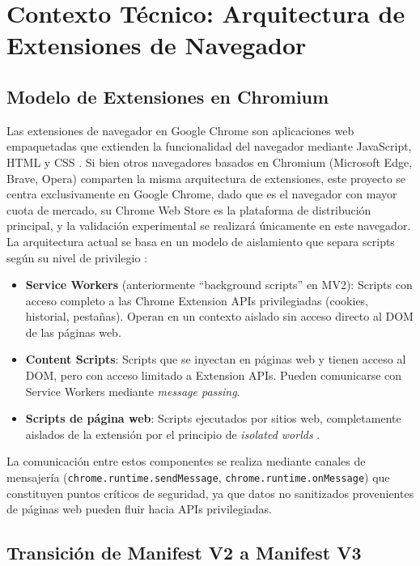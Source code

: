 \documentclass[12pt,oneside]{report}
\begin{document}
\section{Contexto Técnico: Arquitectura de Extensiones de Navegador}

\subsection{Modelo de Extensiones en Chromium}

Las extensiones de navegador en Google Chrome son aplicaciones web empaquetadas que extienden la funcionalidad del navegador mediante JavaScript, HTML y CSS \cite{chrome_extensions_overview}. Si bien otros navegadores basados en Chromium (Microsoft Edge, Brave, Opera) comparten la misma arquitectura de extensiones, este proyecto se centra exclusivamente en Google Chrome, dado que es el navegador con mayor cuota de mercado, su Chrome Web Store es la plataforma de distribución principal, y la validación experimental se realizará únicamente en este navegador. La arquitectura actual se basa en un modelo de aislamiento que separa scripts según su nivel de privilegio \cite{chrome_extensions_security}:

\begin{itemize}
    \item \textbf{Service Workers} (anteriormente ``background scripts'' en MV2): Scripts con acceso completo a las Chrome Extension APIs privilegiadas (cookies, historial, pestañas). Operan en un contexto aislado sin acceso directo al DOM de las páginas web.
    \item \textbf{Content Scripts}: Scripts que se inyectan en páginas web y tienen acceso al DOM, pero con acceso limitado a Extension APIs. Pueden comunicarse con Service Workers mediante \textit{message passing}.
    \item \textbf{Scripts de página web}: Scripts ejecutados por sitios web, completamente aislados de la extensión por el principio de \textit{isolated worlds} \cite{isolated_worlds}.
\end{itemize}

La comunicación entre estos componentes se realiza mediante canales de mensajería (\texttt{chrome.runtime.sendMessage}, \texttt{chrome.runtime.onMessage}) que constituyen puntos críticos de seguridad, ya que datos no sanitizados provenientes de páginas web pueden fluir hacia APIs privilegiadas.

\subsection{Transición de Manifest V2 a Manifest V3}
\end{document}
